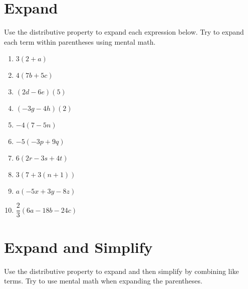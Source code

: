 \documentclass[12pt,letterpaper]{article}
\begin{document}
\section*{Expand}
{Use the distributive property to expand each expression below.
Try to expand each term within parentheses using mental math.}

\begin{large}
\begin{enumerate}
\item \quad $3(2 + a)$

\addvspace{0.5in}

\item \quad $4(7b + 5c)$

\addvspace{0.5in}

\item \quad $(2d - 6e)(5)$

\addvspace{0.5in}

\item \quad $(-3g - 4h)(2)$

\addvspace{0.5in}

\item \quad $-4(7 - 5n)$

\addvspace{0.5in}

\item \quad $-5(-3p + 9q)$

\addvspace{0.5in}

\item \quad $6(2r - 3s + 4t)$

\addvspace{0.5in}

\item \quad $3(7 + 3(n + 1))$

\addvspace{0.5in}

\item \quad $a(-5x + 3y -8z)$

\addvspace{0.5in}

\item \quad $\dfrac{2}{3}(6a - 18b - 24c)$

\end{enumerate}
\end{large}

\pagebreak
\section*{Expand and Simplify}
Use the distributive property to expand and then simplify by combining like terms.
Try to use mental math when expanding the parentheses.
\end{document}
